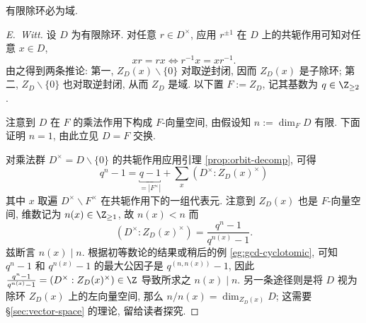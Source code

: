\begin{theorem}\label{prop:Wedderburn-little-thm}
	有限除环必为域.
\end{theorem}
\begin{proof}[E.\ Witt]
	设 $D$ 为有限除环. 对任意 $r \in D^\times$, 应用 $r^{\pm 1}$ 在 $D$ 上的共轭作用可知对任意 $x \in D$,
	\[ xr = rx \iff r^{-1}x = xr^{-1}. \]
	由之得到两条推论: 第一, $Z_D(x) \smallsetminus \{0\}$ 对取逆封闭, 因而 $Z_D(x)$ 是子除环; 第二, $Z_D \smallsetminus \{0\}$ 也对取逆封闭, 从而 $Z_D$ 是域. 以下置 $F := Z_D$, 记其基数为 $q \in \Z_{\geq 2}$.

	注意到 $D$ 在 $F$ 的乘法作用下构成 $F$-向量空间, 由假设知 $n := \dim_F D$ 有限. 下面证明 $n = 1$, 由此立见 $D = F$ 交换.

	对乘法群 $D^\times = D \smallsetminus \{0\}$ 的共轭作用应用引理 \ref{prop:orbit-decomp}, 可得
	\begin{equation}\label{eqn:Wedderburn-little}
		q^n - 1 = \underbracket{q-1}_{= |F^\times|} + \sum_x (D^\times : Z_D(x)^\times)
	\end{equation}
	其中 $x$ 取遍 $D^\times \smallsetminus F^\times$ 在共轭作用下的一组代表元. 注意到 $Z_D(x)$ 也是 $F$-向量空间, 维数记为 $n(x) \in \Z_{\geq 1}$, 故 $n(x) < n$ 而
	\[ (D^\times : Z_D(x)^\times) = \dfrac{q^n - 1}{q^{n(x)} - 1}. \]
	兹断言 $n(x) \mid n$. 根据初等数论的结果或稍后的例 \ref{eg:gcd-cyclotomic}, 可知 $q^n - 1$ 和 $q^{n(x)} - 1$ 的最大公因子是 $q^{(n, n(x))} - 1$, 因此 $\frac{q^n - 1}{q^{n(x)} - 1} = (D^\times : Z_D(x)^\times) \in \Z$ 导致所求之 $n(x) \mid n$. 另一条途径则是将 $D$ 视为除环 $Z_D(x)$ 上的左向量空间, 那么 $n/n(x) = \dim_{Z_D(x)} D$; 这需要 \S\ref{sec:vector-space} 的理论, 留给读者探究.
	

\end{proof}
